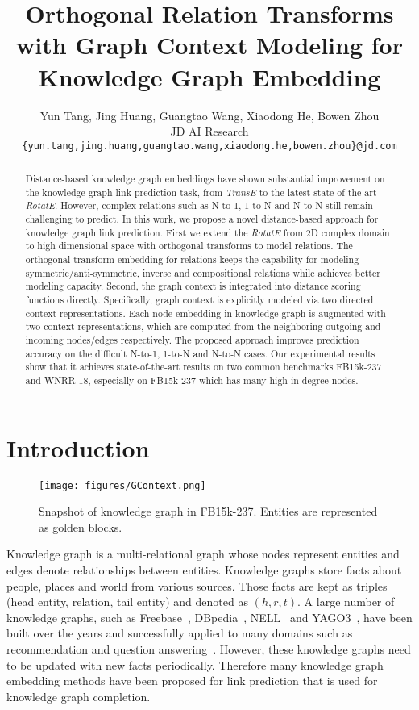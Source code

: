 \documentclass[11pt,a4paper]{article}
\title{Orthogonal Relation Transforms with Graph Context Modeling for Knowledge Graph Embedding}
\author{Yun Tang,  Jing Huang, Guangtao Wang, Xiaodong He, Bowen Zhou \\
  JD AI Research \\
  \texttt{\small\{yun.tang,jing.huang,guangtao.wang,xiaodong.he,bowen.zhou\}@jd.com} \\
}
\date{}
\begin{document}
\maketitle
\begin{abstract}
Distance-based knowledge graph embeddings have shown substantial improvement on the knowledge graph link prediction task, from {\em TransE} to the latest state-of-the-art {\em RotatE}. However, complex relations such as N-to-1, 1-to-N and N-to-N still remain challenging to predict. 
In this work, we propose a novel distance-based approach 
for knowledge graph link prediction. First we extend the {\em RotatE} from 2D complex domain to high dimensional space with orthogonal transforms to model relations. The orthogonal transform embedding for relations keeps the capability for modeling symmetric/anti-symmetric, inverse and compositional relations while achieves better modeling capacity. 
Second, the graph context is integrated into distance scoring functions directly. 
Specifically, graph context is explicitly modeled via two directed context representations. Each node embedding in knowledge graph is augmented with two context representations, which are computed from the neighboring outgoing and incoming nodes/edges respectively. 
The proposed approach improves prediction accuracy on the difficult N-to-1, 1-to-N and N-to-N cases. Our experimental results show that it achieves state-of-the-art results on two common benchmarks FB15k-237 and WNRR-18,
especially on FB15k-237 which has many high in-degree nodes.
\end{abstract}

\section{Introduction}\label{sec:intr}

\begin{figure*}[!ht]
    \centering
    \texttt{[image: figures/GContext.png]}
    \caption{Snapshot of knowledge graph in FB15k-237. Entities are represented as golden blocks. }
    \label{fig:kg}
\end{figure*} 

Knowledge graph is a multi-relational graph whose nodes represent entities and edges denote relationships between entities. 
Knowledge graphs store facts about people, places and world from various sources. Those facts are kept as triples (head entity, relation, tail entity) and denoted as $(h, r, t)$.
A large number of knowledge graphs, such as Freebase~\cite{bollacker2008freebase}, DBpedia~\cite{auer2007dbpedia}, NELL~\cite{carlson2010toward} and YAGO3~\cite{mahdisoltani2013yago3}, have been built over the years and successfully applied to many domains such as recommendation and question answering~\cite{Bordes2014QuestionAW,Zhang2016CollaborativeKB}.
However, these knowledge graphs need to be updated with new facts periodically.
Therefore many knowledge graph embedding methods have been proposed for link prediction that is used for knowledge graph completion.
\end{document}
